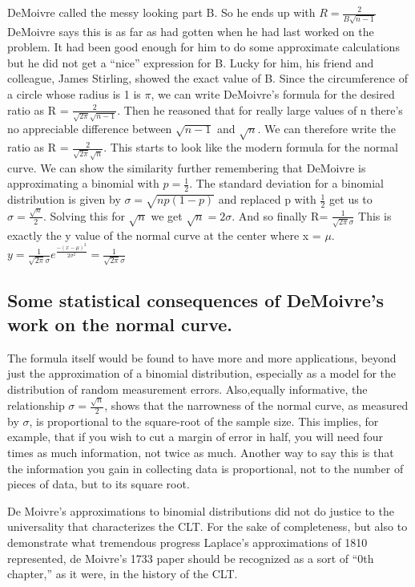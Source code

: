 \documentclass{article}
\begin{document}
DeMoivre called the messy looking part B. So he ends up with $ R= \frac{2}{B \sqrt{n-1}} $
DeMoivre says this is as far as had gotten when he had last worked on the problem.
It had been good enough for him to do some approximate calculations but he did not get a “nice” expression for B.
Lucky for him, his friend and colleague,
James Stirling, showed the exact value of B.
Since the circumference of a circle whose radius is 1 is $ \pi $, we can write DeMoivre’s formula for the desired ratio as R = $ \frac{2}{ \sqrt{2\pi}\sqrt{n-1} } $.
Then he reasoned that for really large values of n there’s no appreciable difference between $ \sqrt{n-1} $ and  $ \sqrt{n}$.
We can therefore write the ratio as  R = $ \frac{2}{ \sqrt{2\pi}\sqrt{n} } $.
This starts to look like the modern formula for the normal curve.
We can show the similarity further remembering that DeMoivre is approximating a binomial with $ p= \frac{1}{2} $. The standard deviation for a binomial distribution is given by $ \sigma = \sqrt{np(1-p)} $ and replaced p with $ \frac{1}{2} $  get us to $ \sigma = \frac{ \sqrt{n}}{2} $.
Solving this for $ \sqrt{n}$ we get $ \sqrt{n}= 2\sigma $.
And so finally R= $ \frac{1}{\sqrt{2\pi}\sigma}$
This is exactly the y value of the normal curve at the center where x = $ \mu $.
$ y= \frac{1}{\sqrt{2\pi}\sigma }e^{{\frac{-(x-\mu)^{2}}{2\sigma^{2}}}}=  \frac{1}{\sqrt{2\pi}\sigma} $

\subsection{Some statistical consequences of DeMoivre’s work on the normal curve.}
The formula itself would be found to have more and more applications, beyond just the approximation of a binomial distribution, especially as a model for the distribution of random measurement errors. Also,equally informative, the relationship $ \sigma = \frac{\sqrt{n}}{2}$, shows that the narrowness of the normal curve, as measured by $\sigma$, is proportional to the square-root of the sample size. This implies, for example, that if you wish to cut a margin of error in half, you will need four times as much information, not twice as much. Another way to say this is that the information you gain in collecting data is proportional, not to the number of pieces of data, but to its square root.

De Moivre’s approximations to binomial distributions did not do justice to the universality that characterizes the CLT. For the sake of completeness, but also to demonstrate what tremendous progress Laplace’s approximations of 1810 represented, de Moivre’s 1733 paper should be recognized as a sort of “0th chapter,” as it were, in the history of the CLT.
\end{document}
